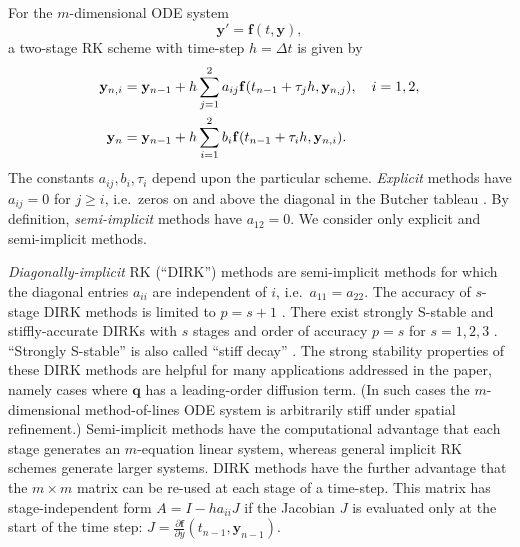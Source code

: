 \documentclass[final,onefignum]{siamart190516}
\newcommand\bbf{\mathbf{f}}
\newcommand\bq{\mathbf{q}}
\newcommand\by{\mathbf{y}}
\begin{document}
For the $m$-dimensional ODE system
\begin{equation}
  \by' = \bbf(t,\by),  \label{eq:abstractODE}
\end{equation}
a two-stage RK scheme \cite{AscherPetzold1998} with time-step $h=\Delta t$ is given by
\begin{align}
  \by_{n,i} &= \by_{n-1} + h \sum_{j=1}^2 a_{ij} \bbf(t_{n-1} + \tau_j h, \by_{n,j}), \quad i=1,2, \label{eq:RK2} \\
      \by_n &= \by_{n-1} + h \sum_{i=1}^2 b_i \bbf(t_{n-1} + \tau_i h, \by_{n,i}). \notag
\end{align}
The constants $a_{ij},b_i,\tau_i$ depend upon the particular scheme.  \emph{Explicit} methods have $a_{ij}=0$ for $j\ge i$, i.e.~zeros on and above the diagonal in the Butcher tableau \cite{AscherPetzold1998}.  By definition, \emph{semi-implicit} methods have $a_{12}=0$.  We consider only explicit and semi-implicit methods.

\emph{Diagonally-implicit} RK (``DIRK'') methods are semi-implicit methods for which the diagonal entries $a_{ii}$ are independent of $i$, i.e.~$a_{11}=a_{22}$.  The accuracy of $s$-stage DIRK methods is limited to $p=s+1$ \cite{AscherPetzold1998}.  There exist strongly S-stable and stiffly-accurate \cite{AscherPetzold1998} DIRKs with $s$ stages and order of accuracy $p=s$ for $s=1,2,3$ \cite{Alexander1977}.  ``Strongly S-stable'' is also called ``stiff decay'' \cite{AscherPetzold1998}.  The strong stability properties of these DIRK methods are helpful for many applications addressed in the paper, namely cases where $\bq$ has a leading-order diffusion term.  (In such cases the $m$-dimensional method-of-lines ODE system is arbitrarily stiff under spatial refinement.)  Semi-implicit methods have the computational advantage that each stage generates an $m$-equation linear system, whereas general implicit RK schemes generate larger systems.  DIRK methods have the further advantage that the $m\times m$ matrix can be re-used at each stage of a time-step.  This matrix has stage-independent form $A = I - h a_{ii} J$ if the Jacobian $J$ is evaluated only at the start of the time step: $J = \frac{\partial \bbf}{\partial y}(t_{n-1},\by_{n-1})$.
\end{document}
